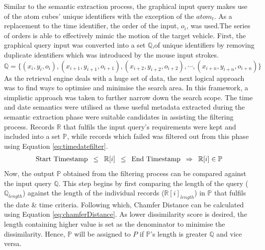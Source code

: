 Similar to the semantic extraction process, the graphical input query makes use of the atom cubes' unique identifiers with the exception of the $atom_t$. As a replacement to the time identifier, the order of the input, $o_{i}$, was used.The series of orders is able to effectively mimic the motion of the target vehicle. First, the graphical query input was converted into a set $\mathbb{Q}$,of unique identifiers by removing duplicate identifiers which was introduced by the mouse input strokes.
\begin{equation}
    \mathbb{Q} = \{ (x_i, y_i, o_i), (x_{i+1}, y_{i+1}, o_{i+1}), (x_{i+2}, y_{i+2}, o_{i+2}), \dotsb,(x_{i+n}, y_{i+n}, o_{i+n})\}
\end{equation}
As the retrieval engine deals with a huge set of data, the next logical approach was to find ways to optimise and minimise the search area. In this framework, a simplistic approach was taken to further narrow down the search scope.
The time and date semantics were utilised as these useful metadata extracted during the semantic extraction phase were suitable candidates in assisting the filtering process.
Records $\mathbb{R}$ that fulfils the input query's requirements were kept and included into a set $\mathbb{P}$, while records which failed was filtered out from this phase using Equation \ref{eq:timedatefilter}.
\begin{gather}
\label{eq:timedatefilter}
     \text{Start Timestamp} \hspace{.5em} \leq \hspace{.5em} \mathbb{R}[i] \hspace{.5em} \leq \hspace{.5em} \text{End Timestamp} \hspace{.5em} \Rightarrow \hspace{.5em} \mathbb{R}[i] \in \mathbb{P}
\end{gather}
Now, the output $\mathbb{P}$ obtained from the filtering process can be compared against the input query $\mathbb{Q}$. This step begins by first comparing the length of the query ($\mathbb{Q}_{length}$) against the length of the individual records ($\mathbb{R}[i]_{length}$) in $\mathbb{P}$ that fulfils the date & time criteria.
Following which, Chamfer Distance can be calculated using Equation \ref{eq:chamferDistance}. As lower dissimilarity score is desired, the length containing higher value is set as the denominator to minimise the dissimilarity. Hence, $\mathbb{P}$ will be assigned to $P$ if $\mathbb{P}$'s length is greater $\mathbb{Q}$ and vice versa.

